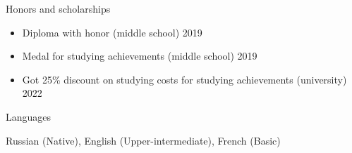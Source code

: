 \documentclass{resume} %
\begin{document}
\begin{rSection}{Honors and scholarships} 
\begin{itemize}
    \item 	Diploma with honor (middle school) \hfill  2019
    \item	Medal for studying achievements (middle school) \hfill 2019
    \item   Got 25\% discount on studying costs for studying achievements (university) \hfill 2022
\end{itemize}


\end{rSection}


 


\begin{rSection}{Languages}

Russian (Native), English (Upper-intermediate), French (Basic)
\end{rSection} 

\end{document}
